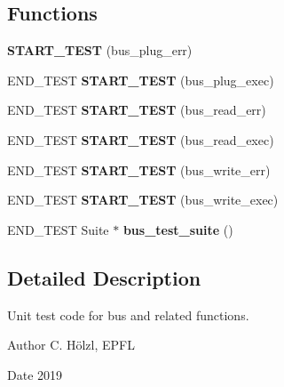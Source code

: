 \subsection*{Functions}
\begin{DoxyCompactItemize}
\item 
\mbox{\label{unit-test-bus_8c_af1bc724cc87168986b4dc6523d37eaeb}} 
{\bfseries S\+T\+A\+R\+T\+\_\+\+T\+E\+ST} (bus\+\_\+plug\+\_\+err)
\item 
\mbox{\label{unit-test-bus_8c_a01b0406fcb184bb66b83f43ca387dc31}} 
E\+N\+D\+\_\+\+T\+E\+ST {\bfseries S\+T\+A\+R\+T\+\_\+\+T\+E\+ST} (bus\+\_\+plug\+\_\+exec)
\item 
\mbox{\label{unit-test-bus_8c_acc540d69bb3fb0ef66042f58bc4a0118}} 
E\+N\+D\+\_\+\+T\+E\+ST {\bfseries S\+T\+A\+R\+T\+\_\+\+T\+E\+ST} (bus\+\_\+read\+\_\+err)
\item 
\mbox{\label{unit-test-bus_8c_add0c190b9efb665e92807ec19191ad90}} 
E\+N\+D\+\_\+\+T\+E\+ST {\bfseries S\+T\+A\+R\+T\+\_\+\+T\+E\+ST} (bus\+\_\+read\+\_\+exec)
\item 
\mbox{\label{unit-test-bus_8c_aa43ed648e83fc1023723286d621d024d}} 
E\+N\+D\+\_\+\+T\+E\+ST {\bfseries S\+T\+A\+R\+T\+\_\+\+T\+E\+ST} (bus\+\_\+write\+\_\+err)
\item 
\mbox{\label{unit-test-bus_8c_a9576910a1ea53981ee93251b9bdc54a0}} 
E\+N\+D\+\_\+\+T\+E\+ST {\bfseries S\+T\+A\+R\+T\+\_\+\+T\+E\+ST} (bus\+\_\+write\+\_\+exec)
\item 
\mbox{\label{unit-test-bus_8c_a9942b766a70847794d9eba89f6f01b42}} 
E\+N\+D\+\_\+\+T\+E\+ST Suite $\ast$ {\bfseries bus\+\_\+test\+\_\+suite} ()
\end{DoxyCompactItemize}


\subsection{Detailed Description}
Unit test code for bus and related functions. 

\begin{DoxyAuthor}{Author}
C. Hölzl, E\+P\+FL 
\end{DoxyAuthor}
\begin{DoxyDate}{Date}
2019 
\end{DoxyDate}


